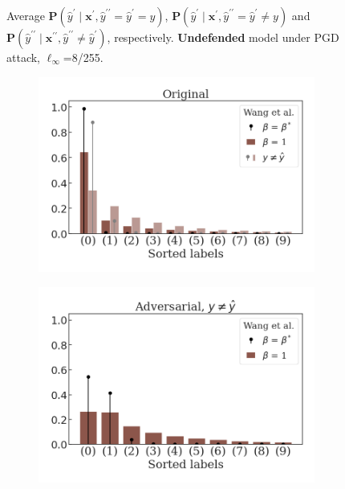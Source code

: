 \begin{figure}[H]
    \caption{Average $\mathbf{P}(\hat{y}^\prime \mid \mathbf{x}^\prime, \hat{y}^{\prime \prime} = \hat{y}^\prime = y)$,
    $\mathbf{P}(\hat{y}^\prime \mid \mathbf{x}^\prime, \hat{y}^{\prime \prime} = \hat{y}^\prime \neq y)$ and
    $\mathbf{P}(\hat{y}^{\prime \prime} \mid \mathbf{x}^{\prime \prime}, \hat{y}^{\prime \prime} \neq \hat{y}^\prime)$,
    respectively. {\color{tab:orange} \textbf{Undefended}} model under PGD attack, $\ell_\infty$=8/255.}
    \label{fig:pgd_distributions_undefended}
\end{figure}
\begin{figure}[H]
    \centering
    \begin{subfigure}[b]{0.45\textwidth}
        \centering
        \includegraphics[width=\textwidth]{img/results_discussion/adversarial/Wang2023Better_WRN-28-10_orig_PGD_0.0314.png}
    \end{subfigure}
    \hfill
    \begin{subfigure}[b]{0.45\textwidth}
        \centering
        \includegraphics[width=\textwidth]{img/results_discussion/adversarial/Wang2023Better_WRN-28-10_adv_PGD_0.0314.png}
    \end{subfigure}


\end{figure}
